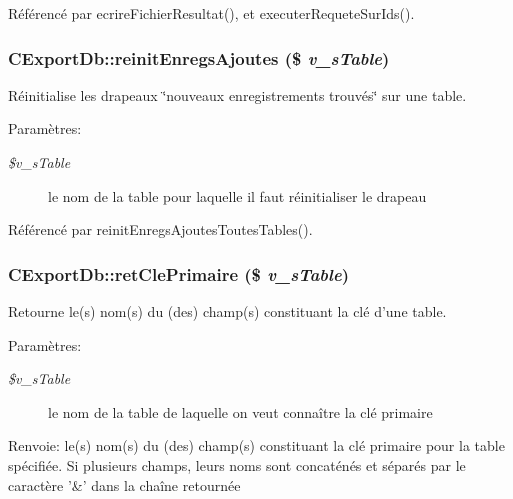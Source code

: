 Référencé par ecrireFichierResultat(), et executerRequeteSurIds().
\subsubsection{\setlength{\rightskip}{0pt plus 5cm}CExportDb::reinitEnregsAjoutes (\$ {\em v\_\-sTable})}\label{class_c_export_db_12c172c570ecd8414a562bb9a2916ee7}


Réinitialise les drapeaux \char`\"{}nouveaux enregistrements trouvés\char`\"{} sur une table. 

\begin{Desc}
\item[Paramètres:]
\begin{description}
\item[{\em \$v\_\-sTable}]le nom de la table pour laquelle il faut réinitialiser le drapeau \end{description}
\end{Desc}


Référencé par reinitEnregsAjoutesToutesTables().
\subsubsection{\setlength{\rightskip}{0pt plus 5cm}CExportDb::retClePrimaire (\$ {\em v\_\-sTable})}\label{class_c_export_db_f7179250481ce229d8c5382b343993d5}


Retourne le(s) nom(s) du (des) champ(s) constituant la clé d'une table. 

\begin{Desc}
\item[Paramètres:]
\begin{description}
\item[{\em \$v\_\-sTable}]le nom de la table de laquelle on veut connaître la clé primaire\end{description}
\end{Desc}
\begin{Desc}
\item[Renvoie:]le(s) nom(s) du (des) champ(s) constituant la clé primaire pour la table spécifiée. Si plusieurs champs, leurs noms sont concaténés et séparés par le caractère '\&' dans la chaîne retournée \end{Desc}


